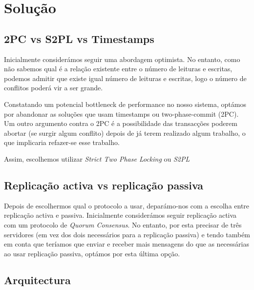 \section{Solução}

\subsection{2PC vs S2PL vs Timestamps}

Inicialmente considerámos seguir uma abordagem optimista. No entanto, como não sabemos qual é a relação existente entre o número de leituras e escritas, podemos admitir que existe igual número de leituras e escritas, logo o número de conflitos poderá vir a ser grande. 

Constatando um potencial bottleneck de performance no nosso sistema, optámos por abandonar as soluções que usam timestamps ou two-phase-commit (2PC). Um outro argumento contra o 2PC é a possibilidade das transacções poderem abortar (se surgir algum conflito) depois de já terem realizado algum trabalho, o que implicaria refazer-se esse trabalho.

Assim, escolhemos utilizar \textit{Strict Two Phase Locking} ou \textit{S2PL}

\subsection{Replicação activa vs replicação passiva}

Depois de escolhermos qual o protocolo a usar, deparámo-nos com a escolha entre replicação activa e passiva. Inicialmente considerámos seguir replicação activa com um protocolo de \textit{Quorum Consensus}. No entanto, por esta precisar de três servidores (em vez dos dois necessários para a replicação passiva) e tendo também em conta que teríamos que enviar e receber mais mensagens do que as necessárias ao usar replicação passiva, optámos por esta última opção.

\subsection{Arquitectura}